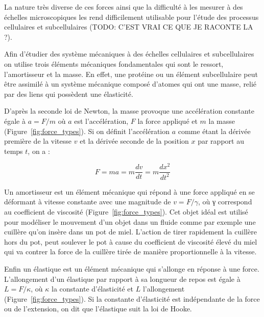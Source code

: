 \documentclass[12pt,a4paper,twoside,openright]{book}
\begin{document}
La nature très diverse de ces forces ainsi que la difficulté à les
mesurer à des échelles microscopiques les rend difficilement utilisable
pour l'étude des processus cellulaires et subcellulaires (TODO: C'EST
VRAI CE QUE JE RACONTE LA ?).

Afin d'étudier des système mécaniques à des échelles cellulaires et
subcellulaires on utilise trois éléments mécaniques fondamentales qui
sont le ressort, l'amortisseur et la masse. En effet, une protéine ou un
élément subcellulaire peut être assimilé à un système mécanique composé
d'atomes qui ont une masse, relié par des liens qui possèdent une
élasticité.

D'après la seconde loi de Newton, la masse provoque une accélération
constante égale à \(a = F/m\) où \(a\) est l'accélération, \(F\) la
force appliqué et \(m\) la masse (Figure~\ref{fig:force_types}). Si on
définit l'accélération \(a\) comme étant la dérivée première de la
vitesse \(v\) et la dérivée seconde de la position \(x\) par rapport au
temps \(t\), on a :

\[
F = ma = m\frac{dv}{dt} = m\frac{dx^2}{dt^2}
\]

Un amortisseur est un élément mécanique qui répond à une force appliqué
en se déformant à vitesse constante avec une magnitude de
\(v = F/\gamma\), où γ correspond au coefficient de viscosité
(Figure~\ref{fig:force_types}). Cet objet idéal est utilisé pour
modéliser le mouvement d'un objet dans un fluide comme par exemple une
cuillère qu'on insère dans un pot de miel. L'action de tirer rapidement
la cuillère hors du pot, peut soulever le pot à cause du coefficient de
viscosité élevé du miel qui va contrer la force de la cuillère tirée de
manière proportionnelle à la vitesse.

Enfin un élastique est un élément mécanique qui s'allonge en réponse à
une force. L'allongement d'un élastique par rapport à sa longueur de
repos est égale à \(L = F/\kappa\), où \(\kappa\) la constante
d'élasticité et \(L\) l'allongement (Figure~\ref{fig:force_types}). Si
la constante d'élasticité est indépendante de la force ou de
l'extension, on dit que l'élastique suit la loi de Hooke.
\end{document}
